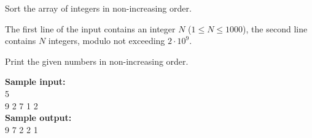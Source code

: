 \documentclass[a4paper]{article}
\begin{document}
Sort the array of integers in non-increasing order.

The first line of the input contains an integer $N$ ($1 \le N \le 1000$), the second line contains $N$ integers, modulo not exceeding $2 \cdot 10^9$.

Print the given numbers in non-increasing order.

\SPACE

\noindent \textbf{Sample input:}\\
5\\
9 2 7 1 2\\


\noindent \textbf{Sample output:}\\
9 7 2 2 1\\
\end{document}
